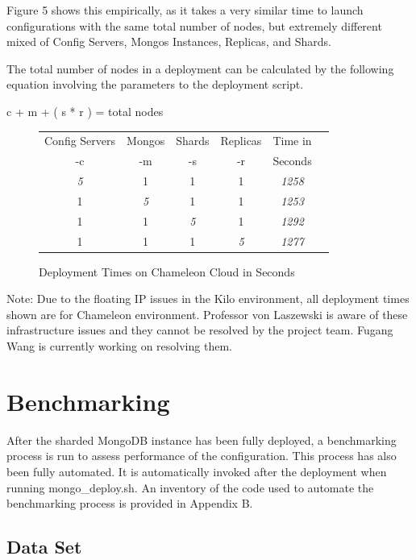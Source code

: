 \documentclass[9pt,twocolumn,twoside]{../../styles/osajnl}
\begin{document}
Figure 5 shows this empirically, as it takes a very similar time to launch configurations with the same total number of nodes, but extremely different mixed of Config Servers, Mongos Instances, Replicas, and Shards.

The total number of nodes in a deployment can be calculated by the following equation involving the parameters to the deployment script.

c + m + ( s * r ) = total nodes

\begin{figure}[ht]
\begin{center}
 \begin{tabular}{| c | c | c | c | c | c |} 
 \hline
Config Servers &  Mongos & Shards & Replicas & Time in \\
-c &  -m & -s & -r & Seconds
\\ [0.5ex] 
 \hline
 \hline
\emph{5} & 1 & 1 & 1 & \emph{1258} \\
 \hline
 1 & \emph{5}  & 1 & 1 & \emph{1253} \\
 \hline
 1 & 1 & \emph{5} & 1 & \emph{1292} \\
 \hline
 1 & 1 & 1 & \emph{5}  & \emph{1277}  \\ [1ex] 
 \hline
\end{tabular}
\end{center}
  \caption{Deployment Times on Chameleon Cloud in Seconds}
\end{figure}

Note: Due to the floating IP issues in the Kilo environment, all deployment times shown are for Chameleon environment.  Professor von Laszewski is aware of these infrastructure issues and they cannot be resolved by the project team.  Fugang Wang is currently working on resolving them.


\section{Benchmarking}

After the sharded MongoDB instance has been fully deployed, a benchmarking process is run to assess performance of the configuration.  This process has also been fully automated.  It is automatically invoked after the deployment when running mongo\_deploy.sh.  An inventory of the code used to automate the benchmarking process is provided in Appendix B.


\subsection{Data Set}
\end{document}
